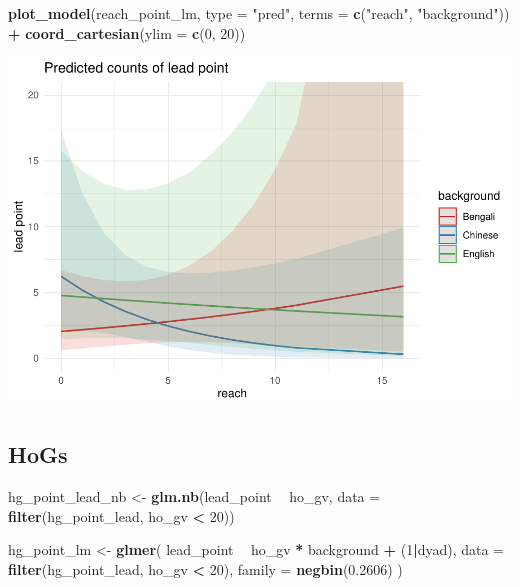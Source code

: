 \documentclass[]{article}
\newenvironment{Shaded}{\begin{snugshade}}{\end{snugshade}}
\newcommand{\DataTypeTok}[1]{\textcolor[rgb]{0.13,0.29,0.53}{#1}}
\newcommand{\DecValTok}[1]{\textcolor[rgb]{0.00,0.00,0.81}{#1}}
\newcommand{\FloatTok}[1]{\textcolor[rgb]{0.00,0.00,0.81}{#1}}
\newcommand{\KeywordTok}[1]{\textcolor[rgb]{0.13,0.29,0.53}{\textbf{#1}}}
\newcommand{\NormalTok}[1]{#1}
\newcommand{\OperatorTok}[1]{\textcolor[rgb]{0.81,0.36,0.00}{\textbf{#1}}}
\newcommand{\StringTok}[1]{\textcolor[rgb]{0.31,0.60,0.02}{#1}}
\begin{document}
\begin{Shaded}
\begin{Highlighting}[]
\KeywordTok{plot_model}\NormalTok{(reach_point_lm, }\DataTypeTok{type =} \StringTok{"pred"}\NormalTok{, }\DataTypeTok{terms =} \KeywordTok{c}\NormalTok{(}\StringTok{"reach"}\NormalTok{, }\StringTok{"background"}\NormalTok{)) }\OperatorTok{+}\StringTok{ }\KeywordTok{coord_cartesian}\NormalTok{(}\DataTypeTok{ylim =} \KeywordTok{c}\NormalTok{(}\DecValTok{0}\NormalTok{, }\DecValTok{20}\NormalTok{))}
\end{Highlighting}
\end{Shaded}

\includegraphics{supplement_files/figure-latex/reach-point-plot-1.pdf}

\hypertarget{hogs}{%
\subsection{HoGs}\label{hogs}}

\begin{Shaded}
\begin{Highlighting}[]
\NormalTok{hg_point_lead_nb <-}\StringTok{ }\KeywordTok{glm.nb}\NormalTok{(lead_point }\OperatorTok{~}\StringTok{ }\NormalTok{ho_gv, }\DataTypeTok{data =} \KeywordTok{filter}\NormalTok{(hg_point_lead, ho_gv }\OperatorTok{<}\StringTok{ }\DecValTok{20}\NormalTok{))}

\NormalTok{hg_point_lm <-}\StringTok{ }\KeywordTok{glmer}\NormalTok{(}
\NormalTok{  lead_point }\OperatorTok{~}
\StringTok{    }\NormalTok{ho_gv }\OperatorTok{*}
\StringTok{    }\NormalTok{background }\OperatorTok{+}
\StringTok{    }\NormalTok{(}\DecValTok{1}\OperatorTok{|}\NormalTok{dyad),}
  \DataTypeTok{data =} \KeywordTok{filter}\NormalTok{(hg_point_lead, ho_gv }\OperatorTok{<}\StringTok{ }\DecValTok{20}\NormalTok{),}
  \DataTypeTok{family =} \KeywordTok{negbin}\NormalTok{(}\FloatTok{0.2606}\NormalTok{)}
\NormalTok{)}
\end{Highlighting}
\end{Shaded}
\end{document}
